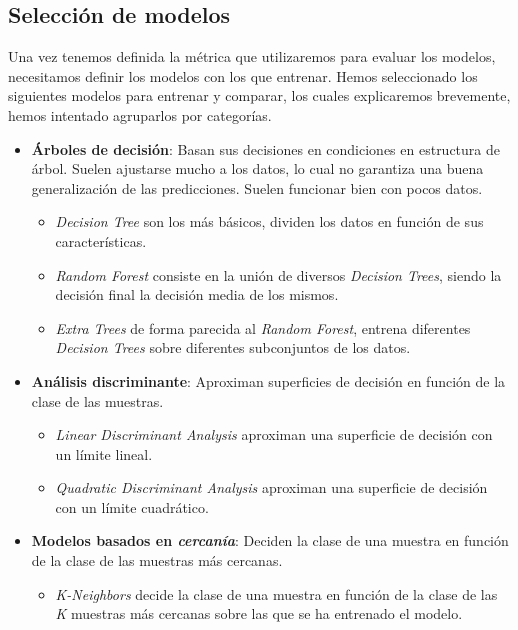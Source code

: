 \subsection{Selección de modelos}

Una vez tenemos definida la métrica que utilizaremos para evaluar los modelos, necesitamos definir los modelos con los que entrenar.
Hemos seleccionado los siguientes modelos para entrenar y comparar, los cuales explicaremos brevemente, hemos intentado agruparlos por categorías.

\begin{itemize}
    \item \textbf{Árboles de decisión}: Basan sus decisiones en condiciones en estructura de árbol. Suelen ajustarse mucho a los datos, lo cual no garantiza una buena generalización de las predicciones. Suelen funcionar bien con pocos datos.
    \begin{itemize}
        \item \textit{Decision Tree} son los más básicos, dividen los datos en función de sus características. \cite{Decision70:online}
        \item \textit{Random Forest} consiste en la unión de diversos \textit{Decision Trees}, siendo la decisión final la decisión media de los mismos. \cite{RandomFo84:online}
        \item \textit{Extra Trees} de forma parecida al \textit{Random Forest}, entrena diferentes \textit{Decision Trees} sobre diferentes subconjuntos de los datos. \cite{ExtraTre48:online}
    \end{itemize}
         \item \textbf{Análisis discriminante}: Aproximan superficies de decisión en función de la clase de las muestras.
        \begin{itemize}
            \item \textit{Linear Discriminant Analysis} aproximan una superficie de decisión con un límite lineal. \cite{LinearDi2:online}
            \item \textit{Quadratic Discriminant Analysis} aproximan una superficie de decisión con un límite cuadrático. \cite{Quadrati79:online}
        \end{itemize}
    \item \textbf{Modelos basados en \textit{cercanía}}: Deciden la clase de una muestra en función de la clase de las muestras más cercanas.
        \begin{itemize}
            \item \textit{K-Neighbors} decide la clase de una muestra en función de la clase de las \textit{K} muestras más cercanas sobre las que se ha entrenado el modelo.

\end{itemize}
\end{itemize}
